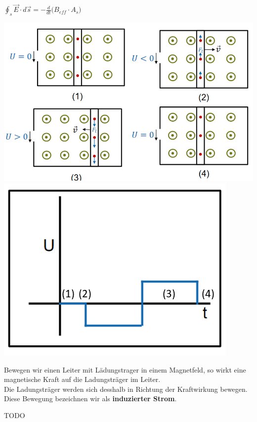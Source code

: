 \formulaBegin
  $\displaystyle  \oint_s \vec{E}\cdot d\vec{s} = -\frac{d}{dt} \big ( B_{eff} \cdot A_s \big ) $
\formulaEnd
\iend
\begin{center}
  \includegraphics[scale=0.6]{img/beweg-ind} \\
    \includegraphics[scale=0.6]{img/beweg-ind-graph}
\end{center}
\beginip
Bewegen wir einen Leiter mit Lädungstrager in einem Magnetfeld, so wirkt eine magnetische Kraft auf die Ladungsträger im Leiter. \\
Die Ladungsträger werden sich desshalb in Richtung der Kraftwirkung bewegen. Diese Bewegung bezeichnen wir als \textbf{induzierter Strom}. \\

\iend

\beginbsp
TODO
\iend


